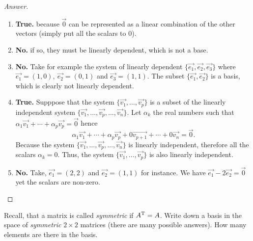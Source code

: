 \documentclass{article}
\def\by{\times}
\begin{document}
\begin{proof}[Answer]
  \text{}
  \begin{enumerate}
    \item \textbf{True.} because $\vec{0}$ can be represented as a linear 
      combination of the other vectors (simply put all the scalars to $0$).
    \item \textbf{No.} if so, they must be linearly dependent, which is not a base.
    \item \textbf{No.} Take for example the system of linearly dependent
      $\{\vec{e_1},\vec{e_2},\vec{e_3}\}$ where 
      $\vec{e_1}=(1,0),~\vec{e_2}=(0,1)$ and $\vec{e_3}=(1,1)$.
      The subset $\{\vec{e_1},\vec{e_2}\}$ is a basis, which is 
      clearly not linearly dependent.
    \item \textbf{True.} Supppose that the system 
      $\{\vec{v_1},\dots,\vec{v_p}\}$
      is a subset of the linearly independent system 
      $\{\vec{v_1},\dots,\vec{v_p},\dots,\vec{v_n}\}$. Let $\alpha_k$ the 
      real numbers such that
      $\alpha_{1}\vec{v_1}+\cdots+\alpha_{p}\vec{v_p}=\vec{0}$
      hence
      \[
        \alpha_{1}\vec{v_1}+\cdots+\alpha_{p}\vec{v_p}+
        0\vec{v_{p+1}}+\cdots+0\vec{v_n}=\vec{0}.
      \]
      Because the system $\{\vec{v_1},\dots,\vec{v_p},\dots,\vec{v_n}\}$
      is linearly independent, therefore all the scalars $\alpha_k=0$. 
      Thus, the system $\{\vec{v_1},\dots,\vec{v_p}\}$ is also linearly
      independent.
    \item \textbf{No.} Take, $\vec{e_1}=(2,2)$ and $\vec{e_2}=(1,1)$ for instance.
      We have $\vec{e_1}-2\vec{e_2}=\vec{0}$ yet the scalars are non-zero.
  \end{enumerate}
\end{proof}
\begin{exercise}
  Recall, that a matrix is called \emph{symmetric} if 
  $A^\mathrm{T}=A$. Write down a basis in the space of \emph{symmetric}
  $2\by 2$ matrices (there are many possible answers). How many
  elements are there in the basis.
\end{exercise}
\end{document}
